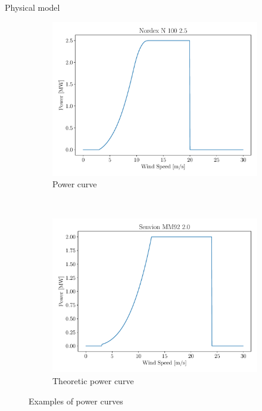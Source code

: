 \documentclass[12pt]{beamer}
\begin{document}
\begin{frame}{Physical model}
	\begin{figure}[H]
		\centering
		\begin{subfigure}[t]{0.48\textwidth}
			\centering
			\includegraphics[width=\textwidth]{resources/pdf/wind_pc.pdf}
			\caption{Power curve}
		\end{subfigure}
		~ 
		\begin{subfigure}[t]{0.48\textwidth}
			\centering
			\includegraphics[width=\textwidth]{resources/pdf/wind_pc_theoretic.pdf}
			\caption{Theoretic power curve}
		\end{subfigure}
		\caption{Examples of power curves}
	\end{figure}
\end{frame}
\end{document}
